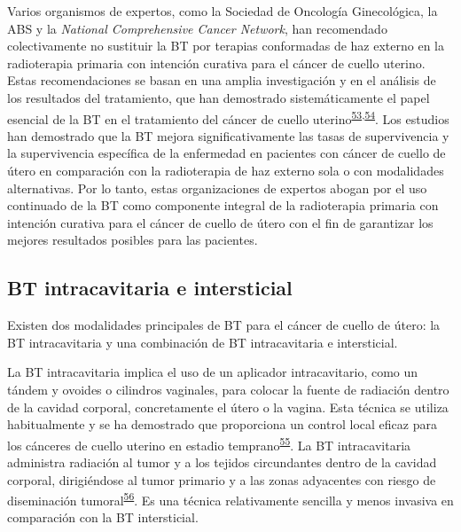 \documentclass[
  a4paper,
]{scrreprt}
\begin{document}
Varios organismos de expertos, como la Sociedad de Oncología
Ginecológica, la ABS y la \emph{National Comprehensive Cancer Network},
han recomendado colectivamente no sustituir la BT por terapias
conformadas de haz externo en la radioterapia primaria con intención
curativa para el cáncer de cuello uterino. Estas recomendaciones se
basan en una amplia investigación y en el análisis de los resultados del
tratamiento, que han demostrado sistemáticamente el papel esencial de la
BT en el tratamiento del cáncer de cuello
uterino\textsuperscript{\protect\hyperlink{ref-holschneider2019}{53},\protect\hyperlink{ref-nationalcomprehensivecancernetworkCervicalCancerVersion}{54}}.
Los estudios han demostrado que la BT mejora significativamente las
tasas de supervivencia y la supervivencia específica de la enfermedad en
pacientes con cáncer de cuello de útero en comparación con la
radioterapia de haz externo sola o con modalidades alternativas. Por lo
tanto, estas organizaciones de expertos abogan por el uso continuado de
la BT como componente integral de la radioterapia primaria con intención
curativa para el cáncer de cuello de útero con el fin de garantizar los
mejores resultados posibles para las pacientes.

\hypertarget{bt-intracavitaria-e-intersticial}{%
\subsection{BT intracavitaria e
intersticial}\label{bt-intracavitaria-e-intersticial}}

Existen dos modalidades principales de BT para el cáncer de cuello de
útero: la BT intracavitaria y una combinación de BT intracavitaria e
intersticial.

La BT intracavitaria implica el uso de un aplicador intracavitario, como
un tándem y ovoides o cilindros vaginales, para colocar la fuente de
radiación dentro de la cavidad corporal, concretamente el útero o la
vagina. Esta técnica se utiliza habitualmente y se ha demostrado que
proporciona un control local eficaz para los cánceres de cuello uterino
en estadio
temprano\textsuperscript{\protect\hyperlink{ref-murofushi2020}{55}}. La
BT intracavitaria administra radiación al tumor y a los tejidos
circundantes dentro de la cavidad corporal, dirigiéndose al tumor
primario y a las zonas adyacentes con riesgo de diseminación
tumoral\textsuperscript{\protect\hyperlink{ref-aggarwal2018}{56}}. Es
una técnica relativamente sencilla y menos invasiva en comparación con
la BT intersticial.
\end{document}
